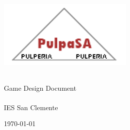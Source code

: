 \begin{titlepage}
    \centering
    \vspace*{\fill} %

    \includegraphics[width=0.5\textwidth]{images/image.png} 
    \vspace{2cm}

    {\Huge \textbf{\thetitle}} \\[1cm]
    {\large Game Design Document} \\[1.5cm]

    {\large \textbf{\theauthor}} \\ [1cm]
    {\large IES San Clemente} \\[4cm]

    \vspace*{\fill} %

    {\large \today}

    \restoregeometry %
\end{titlepage}

